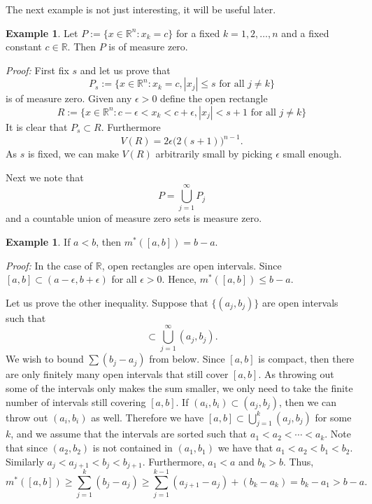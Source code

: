 \documentclass[12pt]{book}
\newcommand{\abs}[1]{\left\lvert {#1} \right\rvert}
\newcommand{\R}{{\mathbb{R}}}
\theoremstyle{plain}
\theoremstyle{remark}
\theoremstyle{definition}
\theoremstyle{exercise}
\theoremstyle{example}
\newtheorem{example}[thm]{Example}
\begin{document}
The next example is not just interesting, it will be useful later.

\begin{example} \label{mv:example:planenull}
Let $P := \{ x \in \R^n : x_k = c \}$ for a fixed $k=1,2,\ldots,n$ and
a fixed constant $c \in \R$.  Then $P$ is of measure zero.

\emph{Proof:}
First fix $s$ and let us prove that
\begin{equation*}
P_s := \{ x \in \R^n : x_k = c, \abs{x_j} \leq s \text{ for all $j\not=k$} \}
\end{equation*}
is of measure zero.
Given any $\epsilon > 0$ define the open rectangle
\begin{equation*}
R := \{ x \in \R^n : c-\epsilon < x_k < c+\epsilon, \abs{x_j} < s+1 \text{ for all $j\not=k$} \}
\end{equation*}
It is clear that $P_s \subset R$.  Furthermore
\begin{equation*}
V(R) = 2\epsilon {\bigl(2(s+1)\bigr)}^{n-1} .
\end{equation*}
As $s$ is fixed, we can
make $V(R)$
arbitrarily small by
picking $\epsilon$ small enough.

Next we note that
\begin{equation*}
P = \bigcup_{j=1}^\infty P_j
\end{equation*}
and a countable union of measure zero sets is measure zero.
\end{example}

\begin{example}
If $a < b$, then $m^*([a,b]) = b-a$.

\emph{Proof:}
In the case of $\R$, open rectangles are open intervals.
Since $[a,b] \subset (a-\epsilon,b+\epsilon)$ for all $\epsilon > 0$.
Hence, $m^*([a,b]) \leq b-a$.

Let us prove the other inequality.
Suppose that $\{ (a_j,b_j) \}$ are open intervals such that
\begin{equation*}
[a,b] \subset \bigcup_{j=1}^\infty (a_j,b_j) .
\end{equation*}
We wish to bound $\sum (b_j-a_j)$ from below.
Since $[a,b]$ is compact, then there are only finitely many open intervals
that still cover $[a,b]$.  As throwing out some of the intervals only makes the
sum smaller, we only need to take the finite number of intervals
still covering $[a,b]$.
If $(a_i,b_i) \subset (a_j,b_j)$, then we can throw out
$(a_i,b_i)$ as well.
Therefore we have
$[a,b] \subset \bigcup_{j=1}^k (a_j,b_j)$ for some $k$, and
we assume that the intervals are sorted such that $a_1 < a_2 < \cdots <
a_k$.  Note that since $(a_2,b_2)$ is not contained in $(a_1,b_1)$
we have that $a_1 < a_2 < b_1 < b_2$.  Similarly
$a_j < a_{j+1} < b_j < b_{j+1}$.  Furthermore, $a_1 < a$ and $b_k > b$.
Thus,
\begin{equation*}
m^*([a,b]) \geq
\sum_{j=1}^k (b_j-a_j)
\geq
\sum_{j=1}^{k-1} (a_{j+1}-a_j)
+
(b_k-a_k)
=
b_k-a_1 > b-a .
\end{equation*}
\end{example}
\end{document}
